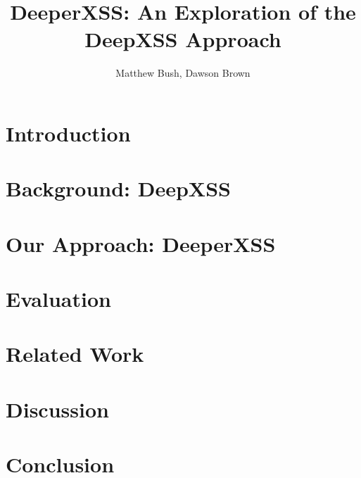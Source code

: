\documentclass[sigconf]{acmart}
\begin{document}
\title{DeeperXSS: An Exploration of the DeepXSS Approach}

\author{Matthew Bush, Dawson Brown}




\begin{abstract}

\end{abstract}



\maketitle


\section{Introduction}
\label{sec:introduction}


\section{Background: DeepXSS}
\label{sec:background}


\section{Our Approach: DeeperXSS}
\label{sec:method}


\section{Evaluation}
\label{sec:evaluation}


\section{Related Work}
\label{sec:related}


\section{Discussion}
\label{sec:discussion}


\section{Conclusion}
\label {sec:conclusion}




\end{document}

